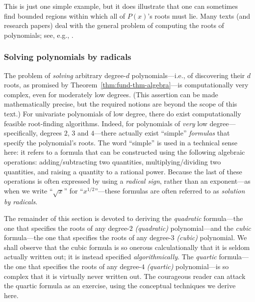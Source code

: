 This is just one simple example, but it does illustrate that one can
sometimes find bounded regions within which all of $P(x)$'s roots must
lie.  Many texts (and research papers) deal with the general problem
of computing the roots of polynomials; see, e.g., \cite{MacDuffee}.


\subsubsection{Solving polynomials by radicals}
\label{sec:poly-by-radical}

The problem of {\it solving} arbitrary degree-$d$ polynomials---i.e.,
of discovering their $d$ roots, as promised by
Theorem~\ref{thm:fund-thm-algebra}---is computationally very complex,
even for moderately low degrees.  (This assertion can be made
mathematically precise, but the required notions are beyond the scope
of this text.)  For univariate polynomials of low degree, there do
exist computationally feasible root-finding algorithms.  Indeed, for
polynomials of {\em very} low degree---specifically, degrees $2$, $3$
and $4$---there actually exist ``simple'' {\em formulas} that specify
the polynomial's roots.  The word ``simple'' is used in a technical
sense here: it refers to a formula that can be constructed using the
following algebraic operations: adding/subtracting two quantities,
multiplying/dividing two quantities, and raising a quantity to a
rational power.  Because the last of these operations is often
expressed by using a {\em radical sign},  rather
than an exponent---as when we write ``$\sqrt{x}$'' for
``$x^{1/2}$''---these formulas are often referred to as {\it solution
  by radicals}.  

The remainder of this section is devoted to deriving the {\em
  quadratic} formula---the one that specifies the roots of any
degree-$2$ {\it (quadratic)} 
polynomial---and the {\em cubic} formula---the one that specifies the
roots of any degree-$3$ {\it (cubic)} polynomial.
 We shall observe that the cubic
formula is so onerous calculationally that it is seldom actually
written out; it is instead specified {\em algorithmically}.  The {\em
  quartic} formula---the one that specifies the roots of any
degree-$4$ {\it (quartic)}  polynomial---is
so complex that it is virtually never written out.  The courageous
reader can attack the quartic formula as an exercise, using the
conceptual techniques we derive here.

